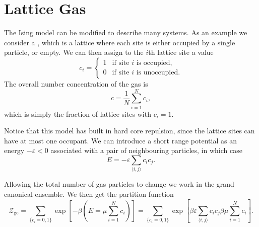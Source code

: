 \documentclass[fleqn]{NotesClass}
\newcommand*{\gcpartition}{\mathcal{Z}_{\mathrm{gc}}}
\begin{document}
    \section{Lattice Gas}
    The Ising model can be modified to describe many systems.
    As an example we consider a , which is a lattice where each site is either occupied by a single particle, or empty.
    We can then assign to the \(i\)th lattice site a value
    \begin{equation}
        c_i = 
        \begin{cases}
            1 & \text{if site \(i\) is occupied},\\
            0 & \text{if site \(i\) is unoccupied}.
        \end{cases}
    \end{equation}
    The overall number concentration of the gas is
    \begin{equation}
        c = \frac{1}{N} \sum_{i = 1}^{N} c_i,
    \end{equation}
    which is simply the fraction of lattice sites with \(c_i = 1\).
    
    Notice that this model has built in hard core repulsion, since the lattice sites can have at most one occupant.
    We can introduce a short range potential as an energy \(-\varepsilon < 0\) associated with a pair of neighbouring particles, in which case
    \begin{equation}
        E = -\varepsilon \sum_{\langle i, j \rangle} c_ic_j.
    \end{equation}
    
    Allowing the total number of gas particles to change we work in the grand canonical ensemble.
    We then get the partition function
    \begin{equation}
        \gcpartition = \sum_{\{c_i = 0, 1\}} \exp\left[ -\beta(E = \mu \sum_{i = 1}^{N} c_i) \right] = \sum_{\{c_i = 0, 1\}} \exp\left[ \beta \varepsilon \sum_{\langle i, j \rangle} c_ic_j \beta\mu \sum_{i = 1}^{N} c_i \right].
    \end{equation}
    
\end{document}
